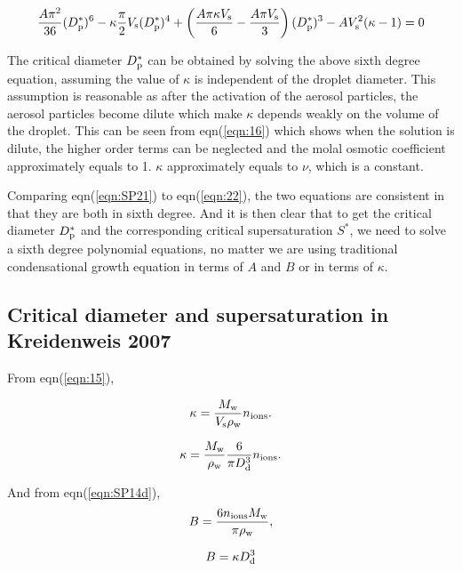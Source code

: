 \documentclass[12pt]{article}
\begin{document}
\begin{equation}\label{eqn:22}
\frac{A\pi^2}{36}(D_{\rm p}^{*})^{6}-\kappa\frac{\pi}{2}V_{\rm s}(D_{\rm p}^{*})^4+\left(\frac{A\pi \kappa V_{\rm s}}{6}-\frac{A\pi V_{\rm s}}{3}\right)(D_{\rm p}^{*})^{3} -A V_{\rm s}^2(\kappa -1) =0
\end{equation}

The critical diameter $D_{\rm p}^{*}$ can be obtained by solving the above sixth degree equation, assuming the value of $\kappa$ is independent of the droplet diameter. This assumption is reasonable as after the activation of the aerosol particles, the aerosol particles become dilute which make $\kappa$ depends weakly on the volume of the droplet. This can be seen from eqn(\ref{eqn:16}) which shows when the solution is dilute, the higher order terms can be neglected and the molal osmotic coefficient approximately equals to 1. $\kappa$  approximately equals to $\nu$, which is a constant.

Comparing eqn(\ref{eqn:SP21}) to eqn(\ref{eqn:22}), the two equations are consistent in that they are both in sixth degree. And it is then clear that to get the critical diameter $D_{\rm p}^{*}$ and the corresponding critical supersaturation $S^{*}$, we need to solve a sixth degree polynomial equations, no matter we are using traditional condensational growth equation in terms of $A$ and $B$ or in terms of $\kappa$.  


\subsection{Critical diameter and supersaturation in Kreidenweis 2007}


From eqn(\ref{eqn:15}), 

\begin{equation}\label{eqn:23}
\kappa= \frac{M_{\rm w}}{V_{\rm s} \rho_{\rm w}}n_{\rm ions}.
\end{equation}

\begin{equation}\label{eqn:24}
\kappa= \frac{M_{\rm w}} {\rho_{\rm w}} \frac{6}{\pi D_{\rm d}^{3}} n_{\rm ions}.
\end{equation}


And from eqn(\ref{eqn:SP14d}),
\begin{equation}\label{eqn:25}
B=\frac{6 n_{\rm ions} M_{\rm w}}{\pi \rho_{\rm w}},
\end{equation}

\begin{equation}\label{eqn:26}
B=\kappa D_{\rm d}^{3}
\end{equation}
\end{document}

